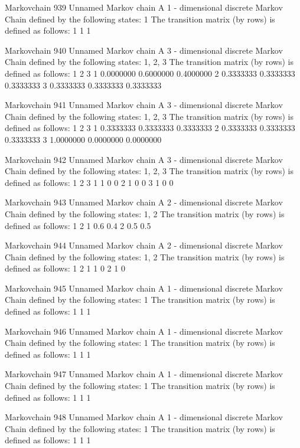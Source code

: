 \documentclass[
  nojss]{jss}
\begin{document}
\begin{CodeChunk}
\begin{CodeOutput}
Markovchain  939 
Unnamed Markov chain 
 A  1 - dimensional discrete Markov Chain defined by the following states: 
 1 
 The transition matrix  (by rows)  is defined as follows: 
  1
1 1

Markovchain  940 
Unnamed Markov chain 
 A  3 - dimensional discrete Markov Chain defined by the following states: 
 1, 2, 3 
 The transition matrix  (by rows)  is defined as follows: 
          1         2         3
1 0.0000000 0.6000000 0.4000000
2 0.3333333 0.3333333 0.3333333
3 0.3333333 0.3333333 0.3333333

Markovchain  941 
Unnamed Markov chain 
 A  3 - dimensional discrete Markov Chain defined by the following states: 
 1, 2, 3 
 The transition matrix  (by rows)  is defined as follows: 
          1         2         3
1 0.3333333 0.3333333 0.3333333
2 0.3333333 0.3333333 0.3333333
3 1.0000000 0.0000000 0.0000000

Markovchain  942 
Unnamed Markov chain 
 A  3 - dimensional discrete Markov Chain defined by the following states: 
 1, 2, 3 
 The transition matrix  (by rows)  is defined as follows: 
  1 2 3
1 1 0 0
2 1 0 0
3 1 0 0

Markovchain  943 
Unnamed Markov chain 
 A  2 - dimensional discrete Markov Chain defined by the following states: 
 1, 2 
 The transition matrix  (by rows)  is defined as follows: 
    1   2
1 0.6 0.4
2 0.5 0.5

Markovchain  944 
Unnamed Markov chain 
 A  2 - dimensional discrete Markov Chain defined by the following states: 
 1, 2 
 The transition matrix  (by rows)  is defined as follows: 
  1 2
1 1 0
2 1 0

Markovchain  945 
Unnamed Markov chain 
 A  1 - dimensional discrete Markov Chain defined by the following states: 
 1 
 The transition matrix  (by rows)  is defined as follows: 
  1
1 1

Markovchain  946 
Unnamed Markov chain 
 A  1 - dimensional discrete Markov Chain defined by the following states: 
 1 
 The transition matrix  (by rows)  is defined as follows: 
  1
1 1

Markovchain  947 
Unnamed Markov chain 
 A  1 - dimensional discrete Markov Chain defined by the following states: 
 1 
 The transition matrix  (by rows)  is defined as follows: 
  1
1 1

Markovchain  948 
Unnamed Markov chain 
 A  1 - dimensional discrete Markov Chain defined by the following states: 
 1 
 The transition matrix  (by rows)  is defined as follows: 
  1
1 1


\end{CodeOutput}
\end{CodeChunk}
\end{document}
